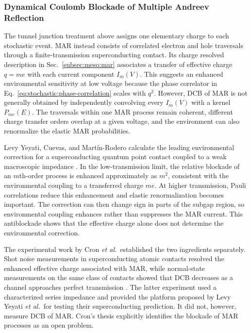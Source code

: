         \subsubsection*{Dynamical Coulomb Blockade of Multiple Andreev Reflection}

            The tunnel junction treatment above assigns one elementary charge to each stochastic event. MAR instead consists of correlated electron and hole traversals through a finite-transmission superconducting contact. Its charge resolved description in Sec.~\ref{subsec:meso:mar} associates a transfer of effective charge $q=me$ with each current component $I_m(V)$. This suggests an enhanced environmental sensitivity at low voltage because the phase correlator in Eq.~\eqref{eq:stochastic:phase-correlation} scales with $q^2$. However, DCB of MAR is not generally obtained by independently convolving every $I_m(V)$ with a kernel $P_{me}(E)$. The traversals within one MAR process remain coherent, different charge transfer orders overlap at a given voltage, and the environment can also renormalize the elastic MAR probabilities.

            Levy Yeyati, Cuevas, and Martín-Rodero calculate the leading environmental correction for a superconducting quantum point contact coupled to a weak macroscopic impedance \cite{levy_yeyati_dynamical_2005}. In the low-transmission limit, the relative blockade of an $m$th-order process is enhanced approximately as $m^2$, consistent with the environmental coupling to a transferred charge $me$. At higher transmission, Pauli correlations reduce this enhancement and elastic renormalization becomes important. The correction can then change sign in parts of the subgap region, so environmental coupling enhances rather than suppresses the MAR current. This antiblockade shows that the effective charge alone does not determine the environmental correction.

            The experimental work by Cron \textit{et al.}~established the two ingredients separately. Shot noise measurements in superconducting atomic contacts resolved the enhanced effective charge associated with MAR, while normal-state measurements on the same class of contacts showed that DCB decreases as a channel approaches perfect transmission \cite{cron_multiple-charge-quanta_2001,cron_contacts_2001}. The latter experiment used a characterized series impedance and provided the platform proposed by Levy Yeyati \textit{et al.}~for testing their superconducting prediction. It did not, however, measure DCB of MAR. Cron's thesis explicitly identifies the blockade of MAR processes as an open problem.

